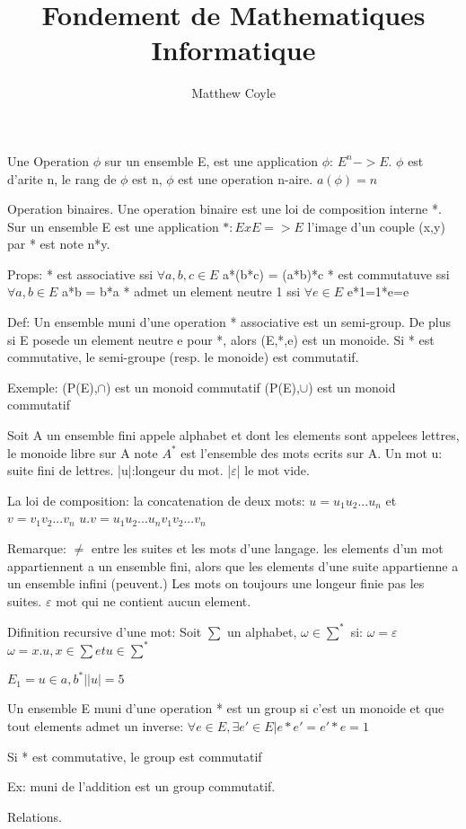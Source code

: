 \documentclass{article}
\author{Matthew Coyle}
\title{Fondement de Mathematiques Informatique}
\begin{document}
Une Operation $\phi$ sur un ensemble E, est une application $\phi$: $E^n -> E$.
$\phi$ est d'arite n, le rang de $\phi$ est n, $\phi$ est une operation n-aire.
$a(\phi)=n$

Operation binaires. Une operation binaire est une loi de composition interne *. Sur un ensemble E est une application $*:ExE=>E$
l'image d'un couple (x,y) par * est note n*y.

Props:
* est associative ssi $\forall a,b,c \in E$ a*(b*c) = (a*b)*c
* est commutatuve ssi $\forall a,b \in E$ a*b = b*a
* admet un element neutre 1 ssi $\forall e \in E$ e*1=1*e=e

Def: Un ensemble muni d'une operation * associative est un semi-group. De plus si E posede un element neutre e pour *, alors (E,*,e) est un monoide. Si * est commutative, le semi-groupe (resp. le monoide) est commutatif.

Exemple: (P(E),$\cap$) est un monoid commutatif
(P(E),$\cup$) est un monoid commutatif

Soit A un ensemble fini appele alphabet et dont les elements sont appelees lettres, le monoide libre sur A note $A^*$ est l'ensemble des mots ecrits sur A.
Un mot u: suite fini de lettres.
|u|:longeur du mot.
|$\varepsilon$| le mot vide.

La loi de composition: la concatenation de deux mots:
$u=u_1u_2...u_n$ et $v=v_1v_2...v_n$ $u.v=u_1u_2...u_nv_1v_2...v_n$

Remarque: $\ne$ entre les suites et les mots d'une langage.
les elements d'un mot appartiennent a un ensemble fini, alors que les elements d'une suite appartienne a un ensemble infini (peuvent.)
Les mots on toujours une longeur finie pas les suites.
$\varepsilon$ mot qui ne contient aucun element.

Difinition recursive d'une mot:
Soit $\sum$ un alphabet, $\omega \in \sum^*$ si:
	$\omega = \varepsilon$
	$\omega = x.u, x \in \sum et u \in \sum^*$

$E_1 = {u \in {a,b}^* | |u|=5 }$

Un ensemble E muni d'une operation * est un group si c'est un monoide et que tout elements admet un inverse:
$\forall e \in E, \exists e' \in E | e*e'=e'*e=1$

Si * est commutative, le group est commutatif

Ex: \Z muni de l'addition est un group commutatif.





Relations.
\end{document}
